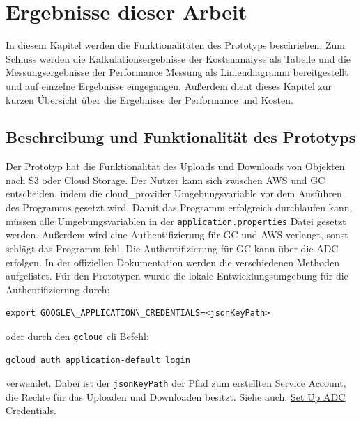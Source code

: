 \chapter{Ergebnisse dieser Arbeit}

In diesem Kapitel werden die Funktionalitäten des Prototyps beschrieben. Zum Schluss werden die Kalkulationsergebnisse der Kostenanalyse als Tabelle und die Messungsergebnisse der Performance Messung als Liniendiagramm bereitgestellt und auf einzelne Ergebnisse eingegangen. Außerdem dient dieses Kapitel zur kurzen Übersicht über die Ergebnisse der Performance und Kosten. 

\section{Beschreibung und Funktionalität des Prototyps}

Der Prototyp hat die Funktionalität des Uploads und Downloads von Objekten nach S3 oder Cloud Storage. Der Nutzer kann sich zwischen AWS und GC entscheiden, indem die cloud\_provider Umgebungsvariable vor dem Ausführen des Programms gesetzt wird. Damit das Programm erfolgreich durchlaufen kann, müssen alle Umgebungsvariablen in der \verb|application.properties| Datei gesetzt werden. Außerdem wird eine Authentifizierung für GC und AWS verlangt, sonst schlägt das Programm fehl. Die Authentifizierung für GC kann über die ADC erfolgen. In der offiziellen Dokumentation werden die verschiedenen Methoden aufgelistet. Für den Prototypen wurde die lokale Entwicklungsumgebung für die Authentifizierung durch: 

\begin{lstlisting}
export GOOGLE\_APPLICATION\_CREDENTIALS=<jsonKeyPath>
\end{lstlisting}
	
	oder durch den \verb|gcloud| cli Befehl: 
	
\begin{lstlisting}
gcloud auth application-default login
\end{lstlisting}
	
	verwendet. Dabei ist der \verb|jsonKeyPath| der Pfad zum erstellten Service Account, die Rechte für das Uploaden und Downloaden besitzt. Siehe auch: \href{https://cloud.google.com/docs/authentication/provide-credentials-adc}{Set Up ADC Credentials}.\\
	
